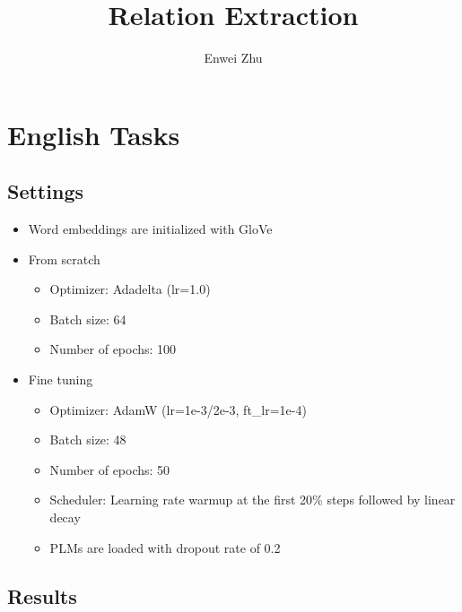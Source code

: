 \documentclass{article}
\title{Relation Extraction}
\author{Enwei Zhu}
\begin{document}
\maketitle

\section{English Tasks}
\subsection{Settings}
\begin{itemize}
    \item Word embeddings are initialized with GloVe
    \item From scratch
    \begin{itemize}
        \item Optimizer: Adadelta (lr=1.0)
        \item Batch size: 64
        \item Number of epochs: 100
    \end{itemize}
    \item Fine tuning 
    \begin{itemize}
        \item Optimizer: AdamW (lr=1e-3/2e-3, ft\_lr=1e-4)
        \item Batch size: 48
        \item Number of epochs: 50
        \item Scheduler: Learning rate warmup at the first 20\% steps followed by linear decay
        \item PLMs are loaded with dropout rate of 0.2
    \end{itemize}
\end{itemize}

\subsection{Results}
\end{document}
